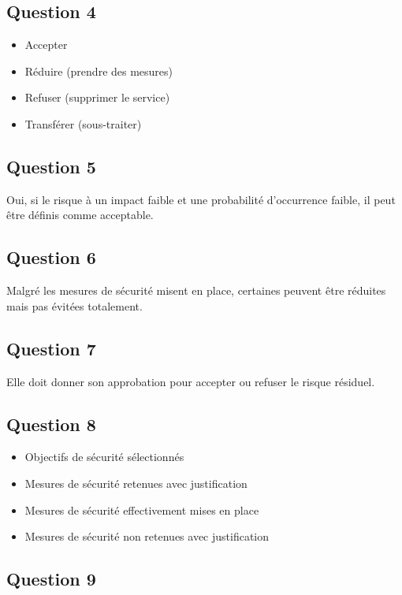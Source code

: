 \documentclass[11pt,a4paper]{article}
\begin{document}
	\subsection{Question 4}
	
	\begin{itemize}
		\item Accepter
		\item Réduire (prendre des mesures)
		\item Refuser (supprimer le service)
		\item Transférer (sous-traiter)
	\end{itemize}

	\subsection{Question 5}
	
	Oui, si le risque à un impact faible et une probabilité d'occurrence faible, il peut être définis comme acceptable.
	
	\subsection{Question 6}
	
	Malgré les mesures de sécurité misent en place, certaines peuvent être réduites mais pas évitées totalement.
	
	\subsection{Question 7}
	
	Elle doit donner son approbation pour accepter ou refuser le risque résiduel.
	
	\subsection{Question 8}
	
	\begin{itemize}
		\item Objectifs de sécurité sélectionnés
		\item Mesures de sécurité retenues avec justification
		\item Mesures de sécurité effectivement mises en place
		\item Mesures de sécurité non retenues avec justification
	\end{itemize}

	\subsection{Question 9}
	
\end{document}
